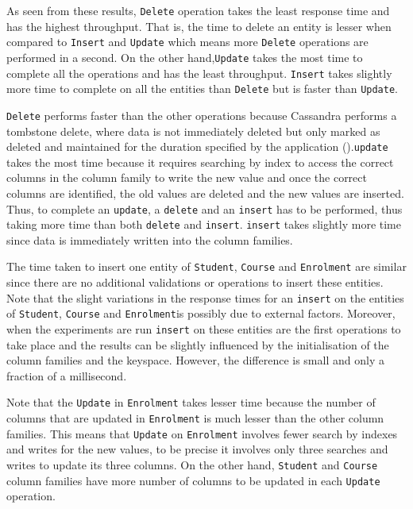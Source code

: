 As seen from these results, \texttt{Delete} operation takes the least response
time and has the highest throughput. That is, the time to delete an entity is
lesser when compared to \texttt{Insert} and \texttt{Update} which means more
\texttt{Delete} operations are performed in a second. On the other
hand,\texttt{Update} takes the most time to complete all the operations and has
the least throughput. \texttt{Insert} takes slightly more time to complete on
all the entities than \texttt{Delete} but is faster than \texttt{Update}.

\texttt{Delete} performs faster than the other operations because Cassandra
performs a tombstone delete, where data is not immediately deleted but only
marked as deleted and maintained for the duration specified by the application
().\texttt{update} takes the most time because it requires
searching by index to access the correct columns in the column family to write
the new value and once the correct columns are identified, the old values are
deleted and the new values are inserted. Thus, to complete an \texttt{update}, a
\texttt{delete} and an \texttt{insert} has to be performed, thus taking more
time than both \texttt{delete} and \texttt{insert}. \texttt{insert} takes
slightly more time since data is immediately written into the column
families.

The time taken to insert one entity of \texttt{Student}, \texttt{Course} and
\texttt{Enrolment} are similar since there are no additional validations or
operations to insert these entities. Note that the slight variations in the
response times for an \texttt{insert} on the entities of \texttt{Student},
\texttt{Course} and \texttt{Enrolment}is possibly due to external factors.
Moreover, when the experiments are run \texttt{insert} on these entities are the
first operations to take place and the results can be slightly influenced by the
initialisation of the column families and the keyspace. However, the difference
is small and only a fraction of a millisecond.

Note that the \texttt{Update} in \texttt{Enrolment} takes lesser time because
the number of columns  that are updated in \texttt{Enrolment} is much lesser
than the other column families. This means that \texttt{Update} on
\texttt{Enrolment} involves fewer search by indexes and writes for the new
values, to be precise it involves only three searches and writes 
to update its three columns.  On the other hand, \texttt{Student} and
\texttt{Course} column families have more number of columns to be updated in
each \texttt{Update} operation.

